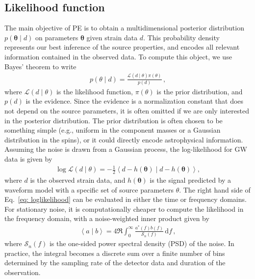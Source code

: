 \documentclass[twocolumn]{aastex631}
\begin{document}
\subsection{Likelihood function}
\label{sec:likelihood}

The main objective of PE is to obtain a multidimensional posterior distribution
$p(\mathbf{\theta} \mid d)$ on parameters $\mathbf{\theta}$ given strain
data $d$.  This probability density represents our best inference of
the source properties, and encodes all relevant information contained in the
observed data.
To compute this object, we use Bayes' theorem to write
\begin{align} \label{eq: bayes}
    p(\theta \mid d) = \frac{\mathcal{L}(d \mid \theta)\pi(\theta)}{p(d)}\, ,
\end{align}
where $\mathcal{L}(d \mid \theta)$ is the likelihood function, $\pi(\theta)$ is
the prior distribution, and $p(d)$ is the evidence. Since the evidence is a
normalization constant that does not depend on the source parameters, it is
often omitted if we are only interested in the posterior distribution. The prior
distribution is often chosen to be something simple (e.g., uniform in the component masses or a Gaussian distribution in the spins), or
it could directly encode astrophysical information. Assuming the noise is drawn from a
Gaussian process, the log-likelihood for GW data is given by
\begin{align}
    \log{\mathcal{L}(d \mid \theta)} = -\frac{1}{2} \left\langle d-h(\mathbf{\theta}) \mid d-h(\mathbf{\theta})\right\rangle,
\label{eq: loglikelihood}
\end{align}
where $d$ is the observed strain data, and $h(\mathbf{\theta})$ is the signal
predicted by a waveform model with a specific set of source parameters
$\theta$.  The right hand side of Eq.~\eqref{eq: loglikelihood} can be
evaluated in either the time or frequency domains. For stationary noise, it is
computationally cheaper to compute the likelihood in the frequency domain, with
a noise-weighted inner product given by
\begin{align}
    \left\langle a \mid b\right\rangle = 4 \Re \int_0^\infty \frac{a^*(f)b(f)}{\mathcal{S}_n(f)}\, \mathrm{d}f \, ,
\label{eq: innerproduct}
\end{align}
where $\mathcal{S}_n(f)$ is the one-sided power spectral density (PSD) of the
noise.  In practice, the integral becomes a discrete sum over a finite number
of bins determined by the sampling rate of the detector data and duration of
the observation.
\end{document}
